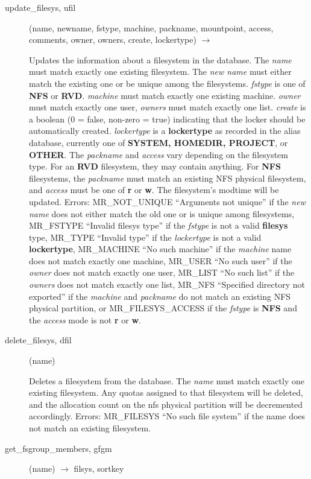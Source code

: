 \documentclass{article}
\begin{document}
\begin{description}
\item[update\_filesys, ufil](name, newname, fstype, machine, packname,
mountpoint, access, comments, owner, owners, create, lockertype)
$\rightarrow$

Updates the information about a filesystem in the database.  The
{\em name} must match exactly one existing filesystem.  The {\em new name}
must either match the existing one or be unique among the filesystems.
{\em fstype} is one of {\bf NFS} or {\bf RVD}.  {\em machine} must match
exactly one existing machine.  {\em owner} must match exactly one user,
{\em owners} must match exactly one list.  {\em create} is a boolean (0 =
false, non-zero = true) indicating that the locker should be
automatically created.  {\em lockertype} is a {\bf lockertype} as recorded
in the alias database, currently one of {\bf SYSTEM, HOMEDIR, PROJECT},
or {\bf OTHER}.  The {\em packname} and {\em access} vary depending on the
filesystem type.  For an {\bf RVD} filesystem, they may contain
anything.  For {\bf NFS} filesystems, the {\em packname} must match an
existing NFS physical filesystem, and {\em access} must be one of {\bf r}
or {\bf w}.  The filesystem's modtime will be updated.  Errors:
MR\_NOT\_UNIQUE ``Arguments not unique'' if the {\em new name} does not
either match the old one or is unique among filesystems, MR\_FSTYPE
``Invalid filesys type'' if the {\em fstype} is not a valid {\bf filesys}
type, MR\_TYPE ``Invalid type'' if the {\em lockertype} is not a valid
{\bf lockertype}, MR\_MACHINE ``No such machine'' if the {\em machine} name
does not match exactly one machine, MR\_USER ``No such user'' if the
{\em owner} does not match exactly one user, MR\_LIST ``No such list'' if
the {\em owners} does not match exactly one list, MR\_NFS ``Specified
directory not exported'' if the {\em machine} and {\em packname} do not
match an existing NFS physical partition, or MR\_FILESYS\_ACCESS if the
{\em fstype} is {\bf NFS} and the {\em access} mode is not {\bf r} or {\bf w}.

\item[delete\_filesys, dfil](name)

Deletes a filesystem from the database.  The {\em name} must match
exactly one existing filesystem.  Any quotas assigned to that
filesystem will be deleted, and the allocation count on the nfs
physical partition will be decremented accordingly.  Errors:
MR\_FILESYS ``No such file system'' if the name does not match an
existing filesystem.

\item[get\_fsgroup\_members, gfgm](name) $\rightarrow$ filsys, sortkey


\end{description}
\end{document}

